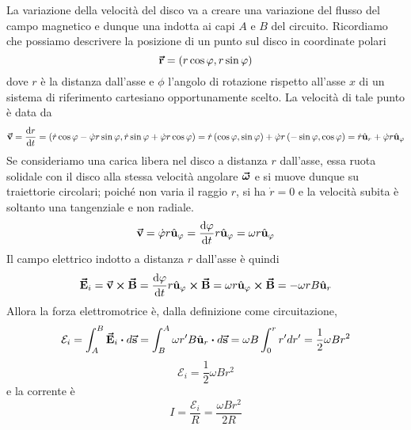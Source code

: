 La variazione della velocità del disco va a creare una variazione del flusso del campo magnetico e dunque una \ddp indotta ai capi $A$ e $B$ del circuito.
Ricordiamo che possiamo descrivere la posizione di un punto sul disco in coordinate polari
\begin{equation*}
	\vb*{\va{r}}=(r\cos\varphi,r\sin\varphi)
\end{equation*}
dove $r$ è la distanza dall'asse e $\phi$ l'angolo di rotazione rispetto all'asse $x$ di un sistema di riferimento cartesiano opportunamente scelto. La velocità di tale punto è data da
\begin{equation*}
	\vb*{\va{v}}=\dv{r}{t}=\left(\dot{r}\cos\varphi-\dot{\varphi}r\sin\varphi,\dot{r}\sin\varphi+\dot{\varphi}r\cos\varphi\right)=\dot{r}\left(\cos\varphi,\sin\varphi\right)+\dot{\varphi}r\left(-\sin\varphi,\cos\varphi\right)=\dot{r}\hat{\mathbf{u}}_r+\dot{\varphi}r\hat{\mathbf{u}}_{\varphi}
\end{equation*}
Se consideriamo una carica libera nel disco a distanza $r$ dall'asse, essa ruota solidale con il disco alla stessa velocità angolare $\vb*{\va{\omega}}$ e si muove dunque su traiettorie circolari; poiché non varia il raggio $r$, si ha $\dot{r}=0$ e la velocità subita è soltanto una tangenziale e non radiale.
\begin{equation*}
	\vb*{\va{v}}=\dot{\varphi}r\hat{\mathbf{u}}_{\varphi}=\dv{\varphi}{t}r\hat{\mathbf{u}}_{\varphi}=\omega r\hat{\mathbf{u}}_{\varphi}
\end{equation*}
Il campo elettrico indotto a distanza $r$ dall'asse è quindi
\begin{equation*}
	\vb*{\va{E}}_i=\vb*{\va{v}}\cross\vb*{\va{B}}=\dv{\varphi}{t}r\hat{\mathbf{u}}_{\varphi}\cross\vb*{\va{B}}=\omega r\hat{\mathbf{u}}_{\varphi}\cross\vb*{\va{B}}=-\omega r B\hat{\mathbf{u}}_r
\end{equation*}
Allora la forza elettromotrice è, dalla definizione come circuitazione, 
\begin{equation*}
	\mathcal{E}_i=\int_{A}^{B}\vba{E}_i\vdot d\vba{s}=\int_{B}^{A}\omega r' B\vbh{u}_r\vdot d\vba{s}=\omega B\int_0^r r'dr'=\frac{1}{2}\omega Br^2
\end{equation*}
\begin{equation}
	\mathcal{E}_i=\frac{1}{2}\omega Br^2
\end{equation}
e la corrente è
\begin{equation}
	I=\frac{\mathcal{E}_i}{R}=\frac{\omega B r^2}{2R}
\end{equation}
